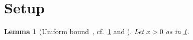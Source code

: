 \documentclass{article}
\newtheorem{lemma}{Lemma}
\begin{document}
\section{Setup}\label{sec:setup}
\begin{lemma}[Uniform bound~\citep{k1}, cf.~\ref{sec:setup} and {\citet[Lemma~2]{k2}}]\label{lem:bound}
Let $x > 0$ as in \ref{lem:bound}.
\end{lemma}


\end{document}

